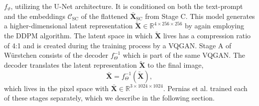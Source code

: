 $f_\vartheta$, utilizing the U-Net architecture. It is conditioned on both the
text-prompt and the embeddings $\mathcal{C}_{\text{SC}}$ of the flattened
$\bar{\boldsymbol{X}}_{\text{SC}}$ from Stage C. This model generates a
higher-dimensional latent representation
$\tilde{\boldsymbol{X}}\in\mathbb{R}^{4\times256\times256}$ by again employing
the DDPM algorithm. The latent space in which $\tilde{\boldsymbol{X}}$ lives
has a compression ratio of 4:1 and is created during the training process by a
VQGAN. Stage A of W\"urstchen consists of the decoder $f_\Theta^{-1}$ which is
part of the same VQGAN. The decoder translates the latent representation
$\tilde{\boldsymbol{X}}$ to the final image,
\begin{equation*}
    \bar{\boldsymbol{X}} = f_\Theta^{-1}(\tilde{\boldsymbol{X}}),
\end{equation*}
which lives in the pixel space with $\bar{\boldsymbol{X}}\in\mathbb{R}^{3\times1024\times1024}$.
Pernias et al. trained each of these stages separately, which we describe in the
following section.

